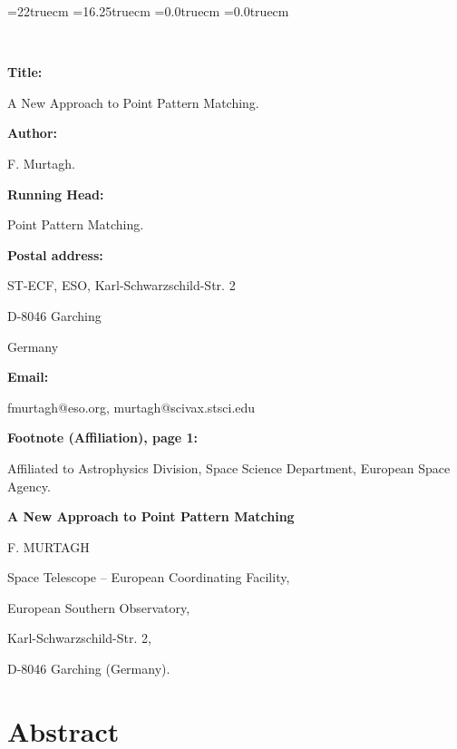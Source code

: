 \textheight=22truecm
\textwidth=16.25truecm
\def\baselinestretch{2.0}
\oddsidemargin=0.0truecm
\evensidemargin=0.0truecm


\

\bigskip

\bigskip

{\bf Title:} 

\medskip

A New Approach to Point Pattern Matching.

\bigskip

{\bf Author:}

\medskip

F. Murtagh.

\bigskip

{\bf Running Head:}

\medskip

Point Pattern Matching.

\bigskip

{\bf Postal address:}

\medskip

ST-ECF, ESO, Karl-Schwarzschild-Str. 2

D-8046 Garching

Germany

\bigskip

{\bf Email:}

\medskip

fmurtagh@eso.org, murtagh@scivax.stsci.edu

\bigskip

{\bf Footnote (Affiliation), page 1:}

\medskip

Affiliated to Astrophysics Division, Space Science Department, European
Space Agency.

\newpage

\begin{center}
{\large{\bf A New Approach to Point Pattern Matching}}

\bigskip

F. MURTAGH

Space Telescope -- European Coordinating Facility,

European Southern Observatory,

Karl-Schwarzschild-Str. 2,

D-8046 Garching (Germany).

\end{center}

\section*{Abstract}

